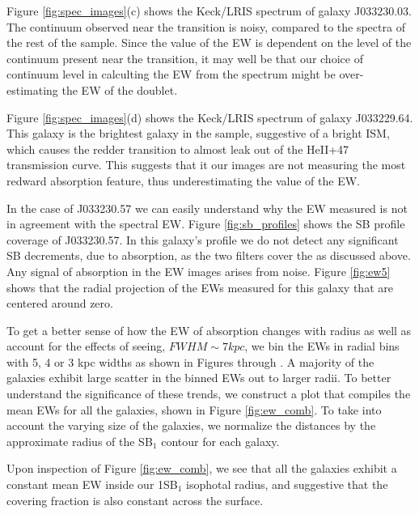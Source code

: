 \documentclass[twocolumn]{aastex61}
\begin{document}
Figure \ref{fig:spec_images}(c) shows the Keck/LRIS spectrum of galaxy J033230.03. The continuum observed near the  transition is noisy, compared to the spectra of the rest of the sample. Since the value of the EW is dependent on the level of the continuum present near the  transition, it may well be that our choice of continuum level in calculting the EW from the spectrum might be over-estimating the EW of the doublet.

Figure \ref{fig:spec_images}(d) shows the Keck/LRIS spectrum of galaxy J033229.64. This galaxy is the brightest galaxy in the sample, suggestive of a bright ISM, which causes the redder transition to almost leak out of the HeII+47 transmission curve. This suggests that it our  images are not measuring the most redward absorption feature, thus underestimating the value of the EW.

In the case of J033230.57 we can easily understand why the EW measured is not in agreement with the spectral EW. Figure \ref{fig:sb_profiles}  shows the SB profile coverage of J033230.57. In this galaxy's profile we do not detect any significant SB decrements, due to absorption, as the two filters cover the  as discussed above. Any signal of absorption in the EW images arises from noise. Figure \ref{fig:ew5} shows that the radial projection of the EWs measured for this galaxy that are centered around zero.

To get a better sense of how the EW of  absorption changes with radius as well as account for the effects of seeing, $FWHM \sim 7 kpc$, we bin the EWs in radial bins with 5, 4 or 3 kpc widths as shown in Figures \label{fig:ew1} through \label{fig:ew5}. A majority of the galaxies exhibit large scatter in the binned EWs out to larger radii. To better understand the significance of these trends, we construct a plot that compiles the mean EWs for all the galaxies, shown in Figure \ref{fig:ew_comb}. To take into account the varying size of the galaxies, we normalize the distances by the approximate radius of the SB$_1$ contour for each galaxy. 

Upon inspection of Figure \ref{fig:ew_comb}, we see that all the galaxies exhibit a constant mean EW inside our 1SB$_1$ isophotal radius, and suggestive that the covering fraction is also constant across the surface.
\end{document}
